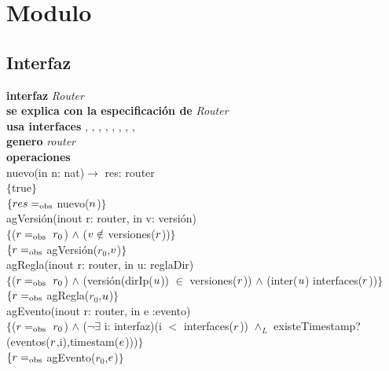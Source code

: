 \section*{Modulo }

\subsection*{Interfaz}
\textbf{interfaz} \textit{Router}\\
\textbf{se explica con la especificaci\'on de} \textit{Router}\\
\textbf{usa interfaces} , , , , , , , , \\
\textbf{genero} \textit{router}\\

\textbf{operaciones}\\

nuevo(in n: nat)$\rightarrow$ res: router\\
$\{$true$\}$\\
$\{{res} =_{\mathrm{obs}}$ nuevo(${n}$)$\}$\\

agVersi\'on(inout r: router, in v: versi\'on)\\
$\{$(${r} =_{\mathrm{obs}}\ r_0$) $\wedge$ (${v} \notin$ versiones(${r}$))$\}$\\
$\{{r} =_{\mathrm{obs}}$ agVersi\'on($r_0$,${v}$)$\}$\\

agRegla(inout r: router, in u: reglaDir)\\
$\{$(${r} =_{\mathrm{obs}}\ r_0$) $\wedge$ (versi\'on(dirIp(${u}$)) $\in$ versiones(${r}$)) $\wedge$ (inter(${u}$) interfaces(${r}$))$\}$\\
$\{{r} =_{\mathrm{obs}}$ agRegla($r_0$,${u}$)$\}$\\

agEvento(inout r: router, in e :evento)\\
$\{$(${r} =_{\mathrm{obs}}\ r_0$) $\wedge$ ($\neg \exists$ i: interfaz)(i $<$ interfaces(${r}$)) $\wedge_L$ existeTimestamp?(eventos(${r}$,i),timestam(${e}$)))$\}$\\
$\{{r}=_{\mathrm{obs}}$ agEvento($r_0$,${e}$)$\}$\\

